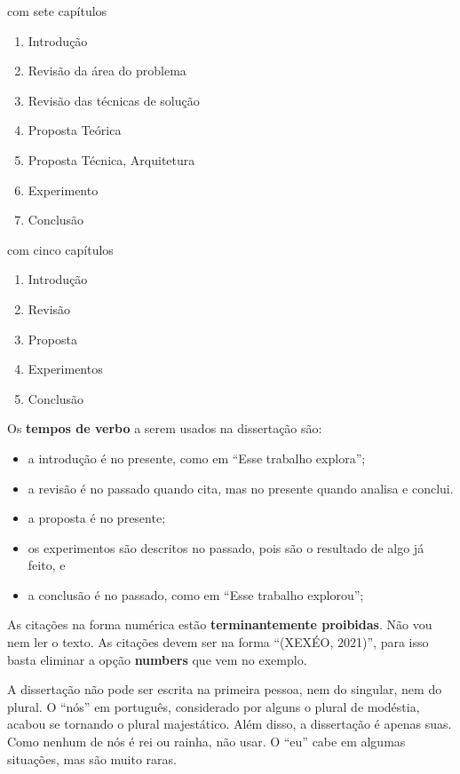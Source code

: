 \documentclass{article}
\begin{document}
\begin{outline}
    \item com sete capítulos
    \begin{enumerate}
        \item Introdução
        \item Revisão da área do problema
        \item Revisão das técnicas de solução
        \item Proposta Teórica
        \item Proposta Técnica, Arquitetura
        \item Experimento 
        \item Conclusão
    \end{enumerate}
    \item com cinco capítulos
    \begin{enumerate}
        \item Introdução
        \item Revisão
        \item Proposta
        \item Experimentos
        \item Conclusão
    \end{enumerate}



Os \textbf{tempos de verbo} a serem usados na dissertação são:
\begin{itemize}
    \item a introdução é no presente, como em ``Esse trabalho explora'';
    \item a revisão é no passado quando cita, mas no presente quando analisa e conclui.
    \item a proposta é no presente;
    \item os experimentos são descritos no passado, pois são o resultado de algo já feito, e
    \item a conclusão é no passado, como em ``Esse trabalho explorou'';
\end{itemize}

As citações na forma numérica estão \textbf{terminantemente proibidas}. Não vou nem ler o texto. As citações devem ser na forma ``(XEXÉO, 2021)'', para isso basta eliminar a opção \textbf{numbers} que vem no exemplo.

A dissertação não pode ser escrita na primeira pessoa, nem do singular, nem do plural. O ``nós'' em português, considerado por alguns o plural de modéstia, acabou se tornando o plural majestático. Além disso, a dissertação é apenas suas. Como nenhum de nós é rei ou rainha, não usar. O ``eu'' cabe em algumas situações, mas são muito raras. 


\end{outline}
\end{document}
